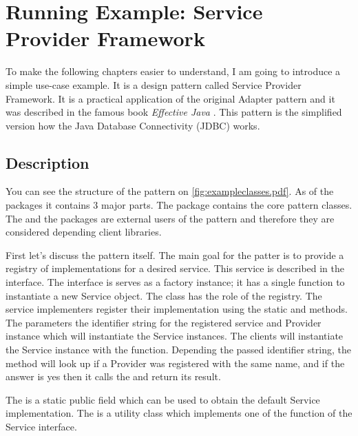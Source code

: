 \section{Running Example: Service Provider Framework}\label{sect:spf}

To make the following chapters easier to understand, I am going to introduce a
simple use-case example. It is a design pattern called Service Provider
Framework. It is a practical application of the original Adapter pattern and it
was described in the famous book \emph{Effective Java} \cite{Bloch08}. This pattern
is the simplified version how the Java Database Connectivity (JDBC) works.

\subsection{Description}


You can see the structure of the pattern on
\autoref{fig:exampleclasses.pdf}. As of the packages it contains 3 major parts.
The  package contains the core pattern classes. The 
and the  packages are external users of the pattern and therefore
they are considered depending client libraries.

First let's discuss the pattern itself. The main goal for the patter is to
provide a registry of implementations for a desired service. This service is
described in the  interface. The  interface is
serves as a factory instance; it has a single function to instantiate a new
Service object. The  class has the role of the registry.
The service implementers register their implementation using the static
 and  methods. The
parameters the identifier string for the registered service and Provider
instance which will instantiate the Service instances. The clients will
instantiate the Service instance with the  function.
Depending the passed identifier string, the method will look up if a Provider
was registered with the same name, and if the answer is yes then it calls the
 and return its result.

The  is a static public field which can be used to
obtain the default Service implementation. The  is a
utility class which implements one of the function of the Service interface.


